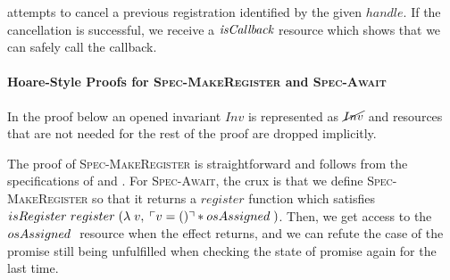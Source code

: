  attempts to cancel a previous registration identified by the given \(handle\).
If the cancellation is successful, we receive a \(\emph{isCallback}{}\) resource which shows that we can safely call the callback.

\paragraph*{Hoare-Style Proofs for \textsc{Spec-MakeRegister} and \textsc{Spec-Await}}

In the proof below an opened invariant \(Inv\) is represented as \(\cancel{Inv}\) and resources that are not needed for the rest of the proof are dropped implicitly.

The proof of \textsc{Spec-MakeRegister} is straightforward and follows from the specifications of  and .
For \textsc{Spec-Await}, the crux is that we define \textsc{Spec-MakeRegister} so that it returns a \(register\) function which satisfies \(isRegister_{}\; register\; (\lambda\; v,\; \ulcorner v = () \urcorner \ast osAssigned\;)\).
Then, we get access to the \(osAssigned\;\) resource when the \esuspend{} effect returns, and we can refute the case of the promise still being unfulfilled when checking the state of promise again for the last time.

